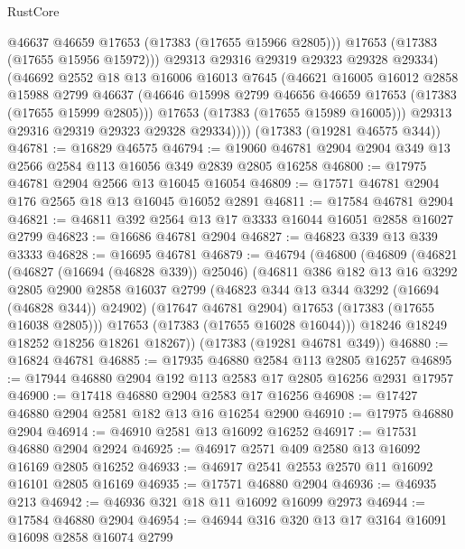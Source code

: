 \begin{lexlean}{RustCore}
\begin{coremodule}
                @46637
                @46659
                @17653
                (@17383 (@17655 @15966 @2805)))
              @17653
              (@17383 (@17655 @15956 @15972)))
            @29313
            @29316
            @29319
            @29323
            @29328
            @29334)
          (@46692
            @2552
            @18
            @13
            @16006
            @16013
            @7645
            (@46621
              @16005
              @16012
              @2858
              @15988
              @2799
              @46637
              (@46646 @15998 @2799 @46656 @46659 @17653 (@17383 (@17655 @15999 @2805)))
              @17653
              (@17383 (@17655 @15989 @16005)))
            @29313
            @29316
            @29319
            @29323
            @29328
            @29334))))
    (@17383 (@19281 @46575 @344))
@46781 := @16829 @46575
@46794 := @19060 @46781 @2904 @2904 @349 @13 @2566 @2584 @113 @16056 @349 @2839 @2805 @16258
@46800 := @17975 @46781 @2904 @2566 @13 @16045 @16054
@46809 := @17571 @46781 @2904 @176 @2565 @18 @13 @16045 @16052 @2891
@46811 := @17584 @46781 @2904
@46821 := @46811 @392 @2564 @13 @17 @3333 @16044 @16051 @2858 @16027 @2799
@46823 := @16686 @46781 @2904
@46827 := @46823 @339 @13 @339 @3333
@46828 := @16695 @46781
@46879 := @46794
    (@46800
      (@46809
        (@46821
          (@46827 (@16694 (@46828 @339)) @25046)
          (@46811
            @386
            @182
            @13
            @16
            @3292
            @2805
            @2900
            @2858
            @16037
            @2799
            (@46823 @344 @13 @344 @3292 (@16694 (@46828 @344)) @24902)
            (@17647 @46781 @2904)
            @17653
            (@17383 (@17655 @16038 @2805)))
          @17653
          (@17383 (@17655 @16028 @16044)))
        @18246
        @18249
        @18252
        @18256
        @18261
        @18267))
    (@17383 (@19281 @46781 @349))
@46880 := @16824 @46781
@46885 := @17935 @46880 @2584 @113 @2805 @16257
@46895 := @17944 @46880 @2904 @192 @113 @2583 @17 @2805 @16256 @2931 @17957
@46900 := @17418 @46880 @2904 @2583 @17 @16256
@46908 := @17427 @46880 @2904 @2581 @182 @13 @16 @16254 @2900
@46910 := @17975 @46880 @2904
@46914 := @46910 @2581 @13 @16092 @16252
@46917 := @17531 @46880 @2904 @2924
@46925 := @46917 @2571 @409 @2580 @13 @16092 @16169 @2805 @16252
@46933 := @46917 @2541 @2553 @2570 @11 @16092 @16101 @2805 @16169
@46935 := @17571 @46880 @2904
@46936 := @46935 @213
@46942 := @46936 @321 @18 @11 @16092 @16099 @2973
@46944 := @17584 @46880 @2904
@46954 := @46944 @316 @320 @13 @17 @3164 @16091 @16098 @2858 @16074 @2799

\end{coremodule}
\end{lexlean}
